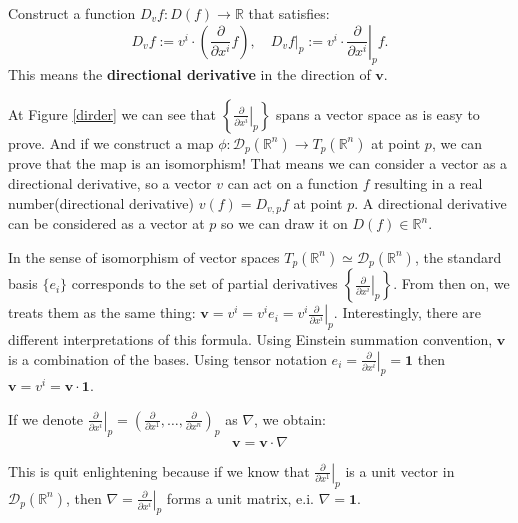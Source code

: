 
\begin{definition}
	Construct a function $D_vf: D(f)\to\mathbb{R}$ that satisfies:
	\[
		D_{v}f := v^i\cdot \left(\frac{\partial}{\partial x^i}f\right), \quad
		\left.D_vf\right|_p := v^i\cdot \left.\frac{\partial}{\partial x^i}\right|_p f.
	\]
	This means the \textbf{directional derivative} in the direction of $\bm{v}$.
\end{definition}

At Figure \ref{dirder} we can see that $\left\{\left.\frac{\partial}{\partial x^i}\right|_p\right\}$ spans a vector space as is easy to prove.
And if we construct a map $\phi: \mathcal{D}_p(\mathbb{R}^n)\to T_p(\mathbb{R}^n)$ at point $p$, we can prove that the map is an isomorphism!
That means we can consider a vector as a directional derivative, so a vector $v$ can act on a function $f$ resulting in a real number(directional derivative) $v(f)=D_{v,p}f$ at point $p$.
A directional derivative can be considered as a vector at $p$ so we can draw it on $D(f)\in\mathbb{R}^n$.


In the sense of isomorphism of vector spaces $T_p(\mathbb{R}^n)\simeq \mathcal{D}_p(\mathbb{R}^n)$, the standard basis $\{e_i\}$ corresponds to the set of partial derivatives $\left\{ \left.\frac{\partial}{\partial x^i}\right|_p \right\}$.
From then on, we treats them as the same thing: $\bm{v}=v^i=v^ie_i=v^i\left.\frac{\partial}{\partial x^i}\right|_p$.
Interestingly, there are different interpretations of this formula. Using Einstein summation convention, $\bm{v}$ is a combination of the bases.
Using tensor notation $e_i=\left.\frac{\partial}{\partial x^i}\right|_p=\bm{1}$ then $\bm{v}=v^i=\bm{v}\cdot\bm{1}$.

If we denote $\left.\frac{\partial}{\partial x^i}\right|_p = \left( \frac{\partial}{\partial x^1}, \dots, \frac{\partial}{\partial x^n} \right)_p$ as $\nabla$, we obtain:
\begin{equation}
	\bm{v} = \bm{v}\cdot\nabla
\end{equation}

This is quit enlightening because if we know that $\left.\frac{\partial}{\partial x^1}\right|_p$ is a unit vector in $\mathcal{D}_p(\mathbb{R}^n)$,
then $\nabla = \left.\frac{\partial}{\partial x^i}\right|_p$ forms a unit matrix, e.i. $\nabla = \bm{1}$.

